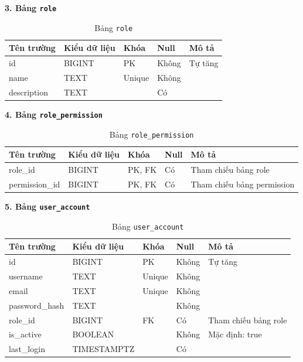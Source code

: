 \documentclass[12pt,a4paper]{report}
\begin{document}
\vspace{0.3cm}
\textbf{3. Bảng \texttt{role}}
\vspace{0.1cm}
\begin{longtable}{|>{\ttfamily}p{3.5cm}|p{2.5cm}|p{1.5cm}|p{1.5cm}|p{5cm}|}
\caption{Bảng \texttt{role}} \label{tab:db_role} \\
\hline
\normalfont\textbf{Tên trường} & \textbf{Kiểu dữ liệu} & \textbf{Khóa} & \textbf{Null} & \textbf{Mô tả} \\ \hline
id & BIGINT & PK & Không & Tự tăng \\ \hline
name & TEXT & Unique & Không & \\ \hline
description & TEXT & & Có & \\ \hline
\end{longtable}

\vspace{0.3cm}
\textbf{4. Bảng \texttt{role\_permission}}
\vspace{0.1cm}
\begin{longtable}{|>{\ttfamily}p{3.5cm}|p{2.5cm}|p{1.5cm}|p{1.5cm}|p{5cm}|}
\caption{Bảng \texttt{role\_permission}} \label{tab:db_role_permission} \\
\hline
\normalfont\textbf{Tên trường} & \textbf{Kiểu dữ liệu} & \textbf{Khóa} & \textbf{Null} & \textbf{Mô tả} \\ \hline
role\_id & BIGINT & PK, FK & Có & Tham chiếu bảng role \\ \hline
permission\_id & BIGINT & PK, FK & Có & Tham chiếu bảng permission \\ \hline
\end{longtable}

\vspace{0.3cm}
\textbf{5. Bảng \texttt{user\_account}}
\vspace{0.1cm}
\begin{longtable}{|>{\ttfamily}p{3.5cm}|p{2.5cm}|p{1.5cm}|p{1.5cm}|p{5cm}|}
\caption{Bảng \texttt{user\_account}} \label{tab:db_user_account} \\
\hline
\normalfont\textbf{Tên trường} & \textbf{Kiểu dữ liệu} & \textbf{Khóa} & \textbf{Null} & \textbf{Mô tả} \\ \hline
id & BIGINT & PK & Không & Tự tăng \\ \hline
username & TEXT & Unique & Không & \\ \hline
email & TEXT & Unique & Không & \\ \hline
password\_hash & TEXT & & Không & \\ \hline
role\_id & BIGINT & FK & Có & Tham chiếu bảng role \\ \hline
is\_active & BOOLEAN & & Không & Mặc định: true \\ \hline
last\_login & TIMESTAMPTZ & & Có & \\ \hline
\end{longtable}
\end{document}
